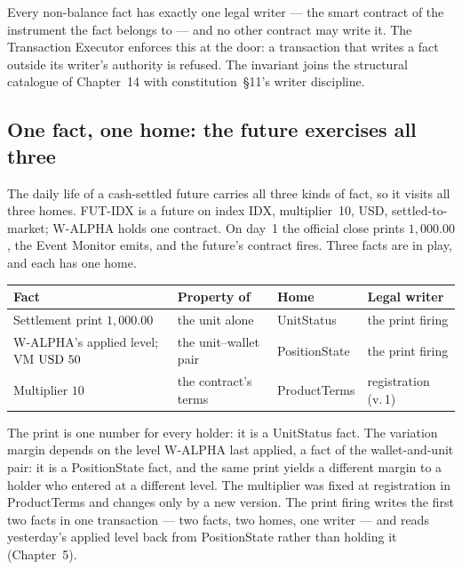 \begin{invariant}\label{inv:one-writer}
Every non-balance fact has exactly one legal writer --- the smart contract of the
instrument the fact belongs to --- and no other contract may write it. The Transaction
Executor enforces this at the door: a transaction that writes a fact outside its writer's
authority is refused. The invariant joins the structural catalogue of
Chapter~14 with constitution~\S 11's writer discipline.
\end{invariant}

\subsection{One fact, one home: the future exercises all three}

The daily life of a cash-settled future carries all three kinds of fact, so it visits all
three homes. FUT-IDX is a future on index IDX, multiplier~10, USD, settled-to-market;
W-ALPHA holds one contract. On day~1 the official close prints $1{,}000.00$, the Event
Monitor emits, and the future's contract fires. Three facts are in play, and each has one
home.

\begin{center}
\begin{tabular}{llll}
\toprule
Fact & Property of & Home & Legal writer \\
\midrule
Settlement print $1{,}000.00$        & the unit alone         & UnitStatus    & the print firing \\
W-ALPHA's applied level; VM $\mbox{USD~50}$ & the unit--wallet pair & PositionState & the print firing \\
Multiplier $10$                      & the contract's terms   & ProductTerms  & registration (v.\,1) \\
\bottomrule
\end{tabular}
\end{center}

The print is one number for every holder: it is a UnitStatus fact. The variation margin
depends on the level W-ALPHA last applied, a fact of the wallet-and-unit pair: it is a
PositionState fact, and the same print yields a different margin to a holder who entered
at a different level. The multiplier was fixed at registration in ProductTerms and changes
only by a new version. The print firing writes the first two facts in one transaction ---
two facts, two homes, one writer --- and reads yesterday's applied level back from
PositionState rather than holding it (Chapter~5).

